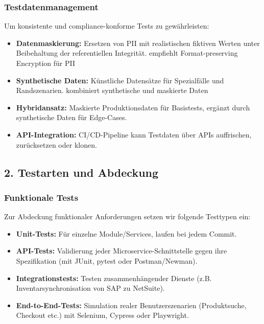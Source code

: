 \subsubsection{Testdatenmanagement}
Um konsistente und compliance-konforme Tests zu gewährleisten:
\begin{itemize}
    \item \textbf{Datenmaskierung:} Ersetzen von PII mit realistischen fiktiven Werten unter Beibehaltung der referentiellen Integrität.\citet{tricentis2024} empfiehlt Format-preserving Encryption für PII
    \item \textbf{Synthetische Daten:} Künstliche Datensätze für Spezialfälle und Randszenarien.\citet{browserstack2025} kombiniert synthetische und maskierte Daten
    \item \textbf{Hybridansatz:} Maskierte Produktionsdaten für Basistests, ergänzt durch synthetische Daten für Edge-Cases.
    \item \textbf{API-Integration:} CI/CD-Pipeline kann Testdaten über APIs auffrischen, zurücksetzen oder klonen.
\end{itemize}
\subsection{2. Testarten und Abdeckung}

\subsubsection{Funktionale Tests}
Zur Abdeckung funktionaler Anforderungen setzen wir folgende Testtypen ein:
\begin{itemize}
    \item \textbf{Unit-Tests:} Für einzelne Module/Services, laufen bei jedem Commit.
    \item \textbf{API-Tests:} Validierung jeder Microservice-Schnittstelle gegen ihre Spezifikation (mit JUnit, pytest oder Postman/Newman).
    \item \textbf{Integrationstests:} Testen zusammenhängender Dienste (z.B. Inventarsynchronisation von SAP zu NetSuite).
    \item \textbf{End-to-End-Tests:} Simulation realer Benutzerszenarien (Produktsuche, Checkout etc.) mit Selenium, Cypress oder Playwright.
\end{itemize}

